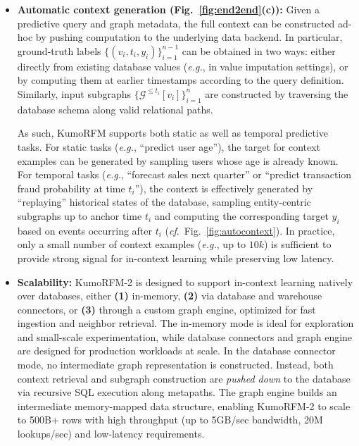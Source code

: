 \documentclass{article}
\newcommand{\twozero}{2\xspace}
\newcommand{\name}{KumoRFM\xspace}
\newcommand{\nametwo}{\name-\twozero}
\begin{document}
\noindent
\begin{itemize}[label=\textcolor{kumo1}{\textbullet},leftmargin=10pt]
\item \textbf{Automatic context generation (Fig.~\ref{fig:end2end}(c)):}
Given a predictive query and graph metadata, the full context can be constructed ad-hoc by pushing computation to the underlying data backend. In particular, ground-truth labels $\{(v_i, t_i, y_i)\}_{i=1}^{n-1}$ can be obtained in two ways: either directly from existing database values (\emph{e.g.}, in value imputation settings), or by computing them at earlier timestamps according to the query definition.
Similarly, input subgraphs $\{ \mathcal{G}^{\leq t_i}[v_i] \}_{i=1}^{n}$ are constructed by traversing the database schema along valid relational paths.

As such, \name supports both static as well as temporal predictive tasks. For static tasks (\emph{e.g.}, ``predict user age''), the target for context examples can be generated by sampling users whose age is already known. For temporal tasks (\emph{e.g.}, ``forecast sales next quarter'' or ``predict transaction fraud probability at time $t_i$''), the context is effectively generated by ``replaying'' historical states of the database, sampling entity-centric subgraphs up to anchor time $t_i$ and computing the corresponding target $y_i$ based on events occurring after $t_i$ (\emph{cf}.~Fig.~\ref{fig:autocontext}).
In practice, only a small number of context examples (\emph{e.g.}, up to $10k$) is sufficient to provide strong signal for in-context learning while preserving low latency.
\end{itemize}

\vspace{-0.3cm}
\begin{itemize}[label=\textcolor{kumo1}{\textbullet},leftmargin=10pt]
\item \textbf{Scalability:} \nametwo{} is designed to support in-context learning natively over databases, either \textbf{(1)} in-memory, \textbf{(2)} via database and warehouse connectors, or \textbf{(3)} through a custom graph engine, optimized for fast ingestion and neighbor retrieval.
The in-memory mode is ideal for exploration and small-scale experimentation, while database connectors and graph engine are designed for production workloads at scale.
In the database connector mode, no intermediate graph representation is constructed.
Instead, both context retrieval and subgraph construction are \emph{pushed down} to the database via recursive SQL execution along metapaths.
The graph engine builds an intermediate memory-mapped data structure, enabling \nametwo to scale to 500B+ rows with high throughput (up to 5GB/sec bandwidth, 20M lookups/sec) and low-latency requirements.
\end{itemize}
\end{document}
